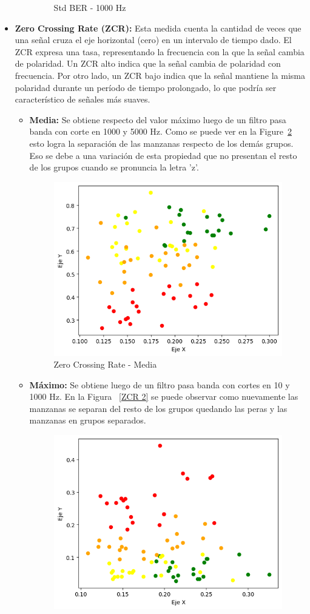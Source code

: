 \documentclass[a4paper, 12pt]{article}
\begin{document}
\begin{itemize}
\begin{itemize}
\begin{figure}[!htbp]
\begin{minipage}[t]{0.5\textwidth}
                    \caption{Std BER - 1000 Hz}
                    \label{BER 6}
                \end{minipage}
            \end{figure}
    \end{itemize}
    \item \textbf{Zero Crossing Rate (ZCR):} Esta medida cuenta la cantidad de veces que una señal cruza el eje horizontal (cero) en un intervalo de tiempo dado.    
        El ZCR expresa una tasa, representando la frecuencia con la que la señal cambia de polaridad. Un ZCR alto indica que la señal cambia de polaridad con frecuencia. Por otro lado, un ZCR bajo indica que la señal mantiene la misma polaridad durante un período de tiempo prolongado, lo que podría ser característico de señales más suaves.
    \begin{itemize}
        \item \textbf{Media:} Se obtiene respecto del valor máximo luego de un filtro pasa banda con corte en 1000 y 5000 Hz. Como se puede ver en la Figure~\ref{ZCR 1} esto logra la separación de las manzanas respecto de los demás grupos. Eso se debe a una variación de esta propiedad que no presentan el resto de los grupos cuando se pronuncia la letra 'z'.
            \begin{figure}[h]
                \centering
                \includegraphics[width=0.4\linewidth]{ZCR1.png}
                \caption{Zero Crossing Rate - Media}
                \label{ZCR 1}
            \end{figure}
        \item \textbf{Máximo:} Se obtiene luego de un filtro pasa banda con cortes en 10 y 1000 Hz. En la Figura ~\ref{ZCR 2} se puede observar como nuevamente las manzanas se separan del resto de los grupos quedando las peras y las manzanas en grupos separados.
            \begin{figure}[h]
                \centering
                \includegraphics[width=0.4\linewidth]{ZCR2.png}

\end{figure}
\end{itemize}
\end{itemize}
\end{document}
